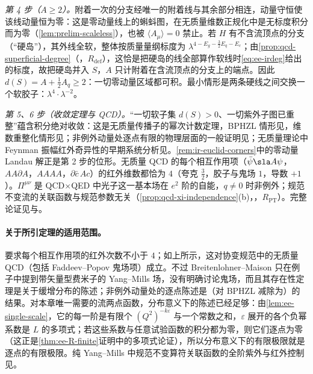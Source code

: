\begin{proofsketch}
\emph{第 4 步（$A\ge2$）。}附着一次的分支经唯一的附着线与其余部分相连，动量守恒使该线动量恒为零：这是零动量线上的蝌蚪图，在无质量维数正规化中是无标度积分而为零（\cref{lem:prelim-scaleless}），也被 $\langle A_\mu\rangle=0$ 禁止。若 $H$ 有不含流顶点的分支（“硬岛”），其外线全软，整体按质量量纲标度为 $\lambda^{4-E_g-\frac32E_q-E_c}$；由\cref{prop:qcd-superficial-degree}（\tagR，$R_{\mathrm{def}}$），这恰是把硬岛的线全部算作软线时\cref{eq:ee-irdeg}给出的标度，故把硬岛并入 $S$，$A$ 只计附着在含流顶点的分支上的端点。因此 $d(S)=A+\frac12A_q\ge2$：一切零动量区域都可积。最小情形是两条硬线之间交换一个软胶子：$\lambda^4\cdot\lambda^{-2}$。

\emph{第 5、6 步（收敛定理与 QCD）。}“一切软子集 $d(S)>0$、一切紫外子图已重整”蕴含积分绝对收敛：这是无质量传播子的幂次计数定理，BPHZL 情形见\cite{LowensteinZimmermann1975,Lowenstein:1975ps}，维数重整化情形见\cite{BreitenlohnerMaison1977a,Breitenlohner:1975hg,Breitenlohner:1976te}；非例外动量处逐点有限的物理层面的一般证明见\cite{PoggioQuinn1976}；无质量理论中 Feynman 振幅红外奇异性的早期系统分析见\cite{Symanzik1973,KinoshitaUkawa1976}。\cref{rem:ir-euclid-corners}中的零动量 Landau 解正是第 2 步的位形。无质量 QCD 的每个相互作用项（$\bar\psi\sla A\psi$，$AA\partial A$，$AAAA$，$\partial\bar c\,Ac$）的红外维数都恰为 $4$（夸克 $\frac32$，胶子与鬼场 $1$，导数 $+1$）。$\Pi^{\mu\nu}$ 是 QCD$\times$QED 中光子这一基本场在 $e^2$ 阶的自能，$q\ne0$ 时非例外；规范不变流的关联函数与规范参数无关（\cref{prop:qcd-xi-independence}(b)，\tagR，$R_{\mathrm{PT}}$）。完整论证见\cite{LowensteinZimmermann1975,Lowenstein:1975ps,Breitenlohner:1975hg,Breitenlohner:1976te}与\cite{PoggioQuinn1976}。
\end{proofsketch}

\paragraph{关于所引定理的适用范围。}\cite{Breitenlohner:1976te}要求每个相互作用项的红外次数不小于 $4$；如上所示，这对协变规范中的无质量 QCD（包括 Faddeev--Popov 鬼场项）成立。不过 Breitenlohner--Maison 只在例子中提到带矢量型费米子的 Yang--Mills 场，没有明确讨论鬼场，而且其存在性定理是关于缓增分布的陈述；非例外动量处的逐点陈述是\cite{PoggioQuinn1976}（对 BPHZL 减除为\cite{LowensteinZimmermann1975}）的结果。对本章唯一需要的流两点函数，分布意义下的陈述已经足够：由\cref{lem:ee-single-scale}，它的每一阶是有限个 $(Q^2)^{-k\varepsilon}$ 与一个常数之和，$\varepsilon$ 展开的各个负幂系数是 $L$ 的多项式；若这些系数与任意试验函数的积分都为零，则它们逐点为零（这正是\cref{thm:ee-R-finite}证明中的多项式论证），所以分布意义下的有限极限就是逐点的有限极限。纯 Yang--Mills 中规范不变算符关联函数的全阶紫外与红外控制见\cite{Frob:2015uqy}。

